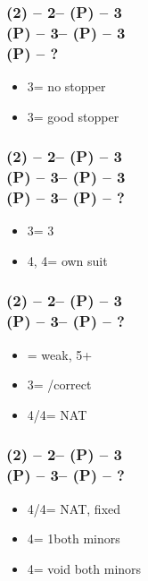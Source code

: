 \subsubsection*{(2\spades) -- 2\nt -- (P) -- 3\clubs \\
                (P) -- 3\diams -- (P) -- 3\hearts \\
                (P) -- ?}
\begin{itemize}
    \item 3\spades = no \spades stopper
    \item 3\nt = good \spades stopper
\end{itemize}

\subsubsection*{(2\spades) -- 2\nt -- (P) -- 3\clubs \\
                (P) -- 3\diams -- (P) -- 3\hearts \\
                (P) -- 3\spades -- (P) -- ?}
\begin{itemize}
    \item 3\nt = 3\hearts
    \item 4\clubs, 4\diams = own suit
\end{itemize}

\subsubsection*{(2\spades) -- 2\nt -- (P) -- 3\diams \\
                (P) -- 3\hearts -- (P) -- ?}
\begin{itemize}
    \item \pass = weak, 5+\hearts
    \item 3\nt = \pass/correct
    \item 4\clubs/4\diams = NAT
\end{itemize}

\subsubsection*{(2\spades) -- 2\nt -- (P) -- 3\hearts \\
                (P) -- 3\spades -- (P) -- ?}
\begin{itemize}
    \item 4\clubs/4\diams = NAT, fixed
    \item 4\hearts = 1\spades both minors
    \item 4\spades = void \spades both minors
\end{itemize}

